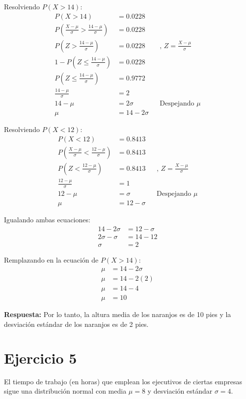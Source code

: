 \documentclass{templateNote}
\begin{document}
Resolviendo $P(X > 14)$:
\begin{align*}
  P(X > 14) &= 0.0228 \\
  P\left(\frac{X - \mu}{\sigma} > \frac{14 - \mu}{\sigma}\right) &= 0.0228 \\
  P\left(Z > \frac{14 - \mu}{\sigma}\right) &= 0.0228 && \text{, } Z = \frac{X - \mu}{\sigma} \\
  1 - P\left(Z \leq \frac{14 - \mu}{\sigma}\right) &= 0.0228 \\
  P\left(Z \leq \frac{14 - \mu}{\sigma}\right) &= 0.9772 \\
  \frac{14 - \mu}{\sigma} &= 2 \\
  14 - \mu &= 2\sigma && \text{Despejando } \mu \\
  \mu &= 14 - 2\sigma
\end{align*}

Resolviendo $P(X < 12)$:
\begin{align*}
  P(X < 12) &= 0.8413 \\
  P\left(\frac{X - \mu}{\sigma} < \frac{12 - \mu}{\sigma}\right) &= 0.8413 \\
  P\left(Z < \frac{12 - \mu}{\sigma}\right) &= 0.8413 && \text{, } Z = \frac{X - \mu}{\sigma} \\
  \frac{12 - \mu}{\sigma} &= 1 \\
  12 - \mu &= \sigma && \text{Despejando } \mu \\
  \mu &= 12 - \sigma
\end{align*}

\newpage
Igualando ambas ecuaciones:
\begin{align*}
  14 - 2\sigma &= 12 - \sigma \\
  2\sigma - \sigma &= 14 - 12 \\
  \sigma &= 2
\end{align*}

Remplazando en la ecuación de $P(X > 14)$:
\begin{align*}
  \mu &= 14 - 2\sigma \\
  \mu &= 14 - 2(2) \\
  \mu &= 14 - 4 \\
  \mu &= 10
\end{align*}

\textbf{Respuesta:} Por lo tanto, la altura media de los naranjos es de 10 pies y la desviación estándar de los naranjos es de 2 pies.

\section*{Ejercicio 5}
El tiempo de trabajo (en horas) que emplean los ejecutivos de ciertas empresas sigue una distribución normal con media  $\mu = 8$ y desviación estándar  $\sigma = 4$.
\end{document}
